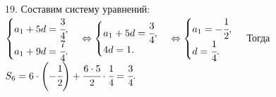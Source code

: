 19. Составим систему уравнений: $\begin{cases}a_1+5d=\cfrac{3}{4},\\a_1+9d=\cfrac{7}{4}.\end{cases}\Leftrightarrow\begin{cases}a_1+5d=\cfrac{3}{4},\\4d=1.\end{cases}
\Leftrightarrow\begin{cases}a_1=-\cfrac{1}{2},\\d=\cfrac{1}{4}.\end{cases}$ Тогда $S_6=6\cdot\left(-\cfrac{1}{2}\right)+\cfrac{6\cdot5}{2}\cdot\cfrac{1}{4}=\cfrac{3}{4}.$\\
